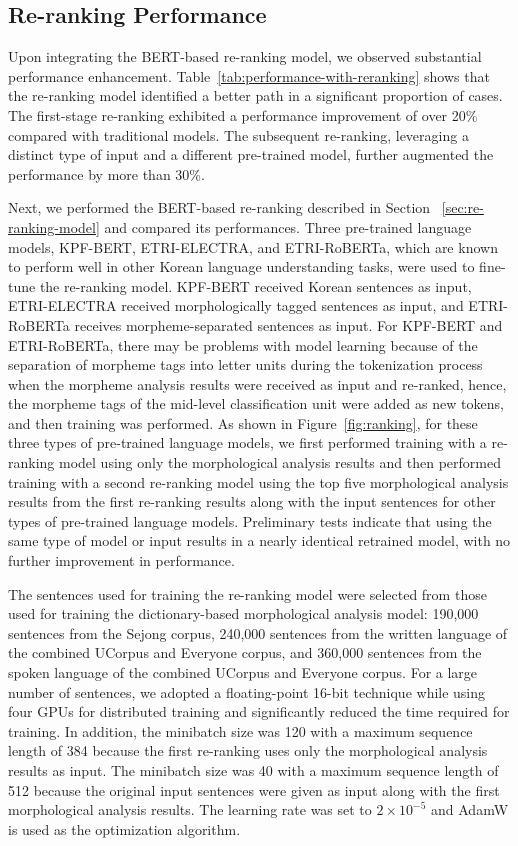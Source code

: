 \documentclass[AMS,STIX2COL]{WileyNJD-v2}
\begin{document}
    \subsection{Re-ranking Performance}\label{subsec5.4}

    Upon integrating the BERT-based re-ranking model, we observed substantial performance enhancement.
    Table~\ref{tab:performance-with-reranking} shows that the re-ranking model identified a better path in a significant proportion of cases.
    The first-stage re-ranking exhibited a performance improvement of over 20\% compared with traditional models.
    The subsequent re-ranking, leveraging a distinct type of input and a different pre-trained model, further augmented the performance by more than 30\%.

    Next, we performed the BERT-based re-ranking described in Section ~\ref{sec:re-ranking-model} and compared its performances.
    Three pre-trained language models, KPF-BERT, ETRI-ELECTRA, and ETRI-RoBERTa, which are known to perform well in other Korean language understanding tasks, were used to fine-tune the re-ranking model.
    KPF-BERT received Korean sentences as input, ETRI-ELECTRA received morphologically tagged sentences as input, and ETRI-RoBERTa receives morpheme-separated sentences as input.
    For KPF-BERT and ETRI-RoBERTa, there may be problems with model learning because of the separation of morpheme tags into letter units during the tokenization process when the morpheme analysis results were received as input and re-ranked, hence, the morpheme tags of the mid-level classification unit were added as new tokens, and then training was performed.
    As shown in Figure~\ref{fig:ranking}, for these three types of pre-trained language models, we first performed training with a re-ranking model using only the morphological analysis results and then performed training with a second re-ranking model using the top five morphological analysis results from the first re-ranking results along with the input sentences for other types of pre-trained language models.
    Preliminary tests indicate that using the same type of model or input results in a nearly identical retrained model, with no further improvement in performance.

    The sentences used for training the re-ranking model were selected from those used for training the dictionary-based morphological analysis model: 190,000 sentences from the Sejong corpus, 240,000 sentences from the written language of the combined UCorpus and Everyone corpus, and 360,000 sentences from the spoken language of the combined UCorpus and Everyone corpus.
    For a large number of sentences, we adopted a floating-point 16-bit technique while using four GPUs for distributed training and significantly reduced the time required for training.
    In addition, the minibatch size was 120 with a maximum sequence length of 384 because the first re-ranking uses only the morphological analysis results as input.
    The minibatch size was 40 with a maximum sequence length of 512 because the original input sentences were given as input along with the first morphological analysis results.
    The learning rate was set to $2 \times 10^{-5}$ and AdamW is used as the optimization algorithm.
\end{document}
